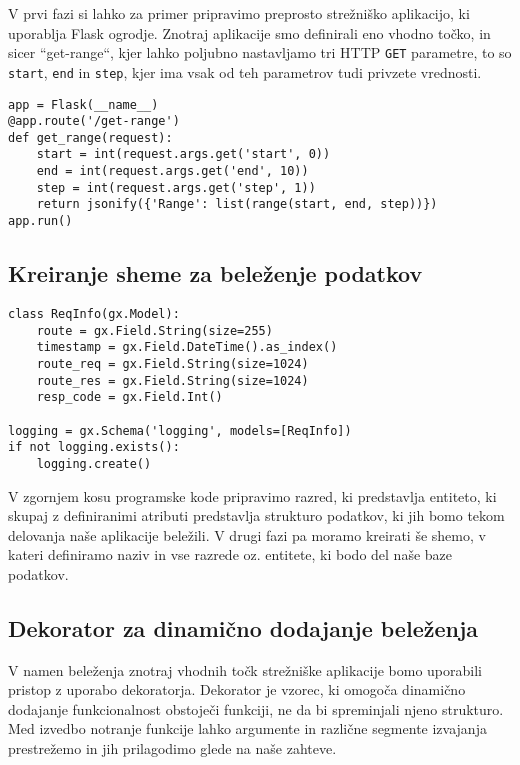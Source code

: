\documentclass[a4paper,12pt,openright]{book}
\begin{document}
    V prvi fazi si lahko za primer pripravimo preprosto strežniško aplikacijo, ki uporablja Flask \cite{FLASK_GITHUB} ogrodje. Znotraj aplikacije smo definirali eno vhodno točko, in sicer ``get-range``, kjer lahko poljubno nastavljamo tri HTTP {\tt GET} parametre, to so {\tt start}, {\tt end} in {\tt step}, kjer ima vsak od teh parametrov tudi privzete vrednosti.
    
\begin{verbatim}
app = Flask(__name__)
@app.route('/get-range')
def get_range(request):
    start = int(request.args.get('start', 0))
    end = int(request.args.get('end', 10))
    step = int(request.args.get('step', 1))
    return jsonify({'Range': list(range(start, end, step))})
app.run()
\end{verbatim}

    \subsection{Kreiranje sheme za beleženje podatkov}
\begin{verbatim}
class ReqInfo(gx.Model):
    route = gx.Field.String(size=255)
    timestamp = gx.Field.DateTime().as_index()
    route_req = gx.Field.String(size=1024)
    route_res = gx.Field.String(size=1024)
    resp_code = gx.Field.Int()

logging = gx.Schema('logging', models=[ReqInfo])
if not logging.exists():
    logging.create()
\end{verbatim}

    \noindent
    V zgornjem kosu programske kode pripravimo razred, ki predstavlja entiteto, ki skupaj z definiranimi atributi predstavlja strukturo podatkov, ki jih bomo tekom delovanja naše aplikacije beležili. V drugi fazi pa moramo kreirati še shemo, v kateri definiramo naziv in vse razrede oz. entitete, ki bodo del naše baze podatkov.

    \subsection{Dekorator za dinamično dodajanje beleženja}

    V namen beleženja znotraj vhodnih točk strežniške aplikacije bomo uporabili pristop z uporabo dekoratorja.
    Dekorator je vzorec,  ki omogoča dinamično dodajanje funkcionalnost obstoječi funkciji, ne da bi spreminjali njeno strukturo. Med izvedbo notranje funkcije lahko argumente in različne segmente izvajanja prestrežemo in jih prilagodimo glede na naše zahteve.
    
\end{document}
